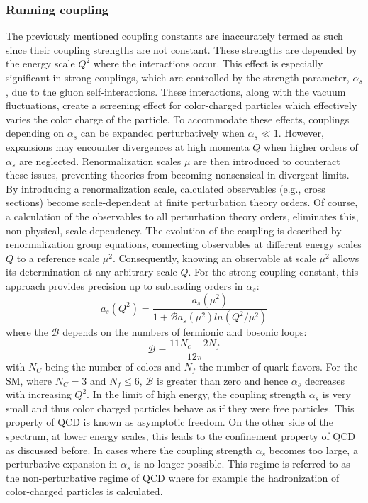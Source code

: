 \subsubsection{\label{subsubsec:Running_coupling}Running coupling}
\noindent The previously mentioned coupling constants are inaccurately termed as such since their coupling strengths are not constant. These strengths are depended by the energy scale $Q^2$ where the interactions occur. This effect is especially significant in strong couplings, which are controlled by the strength parameter, $\alpha_{s}$, due to the gluon self-interactions. These interactions, along with the vacuum fluctuations, create a screening effect for color-charged particles which effectively varies the color charge of the particle. To accommodate these effects, couplings depending on \( \alpha_s \) can be expanded perturbatively when \( \alpha_s \ll 1 \). However, expansions may encounter divergences at high momenta  $Q$ when higher orders of \( \alpha_s \) are neglected. Renormalization scales \( \mu \) are then introduced to counteract these issues, preventing theories from becoming nonsensical in divergent limits. By introducing a renormalization scale, calculated observables (e.g., cross sections) become scale-dependent at finite perturbation theory orders. Of course, a calculation of the observables to all perturbation theory orders, eliminates this, non-physical, scale dependency. The evolution of the coupling is described by renormalization group equations, connecting observables at different energy scales \( Q \) to a reference scale \( \mu^2 \). Consequently, knowing an observable at scale \( \mu^2 \) allows its determination at any arbitrary scale \( Q \). For the strong coupling constant, this approach provides precision up to subleading orders in \( \alpha_s \):
\begin{equation}
    a_s(Q^2) = \frac{a_s(\mu^2)}{1 + \mathscr{B}a_s(\mu^2)ln(Q^2/\mu^2)}
\end{equation}
where the $\mathscr{B}$ depends on the numbers of fermionic and bosonic loops:
\begin{equation}\label{eq:beta_function}
    \mathscr{B}=\frac{11N_c - 2N_f}{12\pi}
\end{equation}
with $N_C$ being the number of colors and $N_f$ the number of quark flavors. For the SM, where $N_C =3$ and $N_f \leq 6$, $\mathscr{B}$ is greater than zero and hence $\alpha_s$ decreases with increasing $Q^2$. In the limit of high energy, the coupling strength $\alpha_s$ is very small and thus color charged particles behave as if they were free particles. This property of QCD is known as asymptotic freedom. %
On the other side of the spectrum, at lower energy scales, this leads to the confinement property of QCD as discussed before. In cases where the coupling strength $\alpha_s$ becomes too large, a perturbative expansion in $\alpha_s$ is no longer possible. This regime is referred to as the non-perturbative regime of QCD where for example the hadronization of color-charged particles is calculated.

